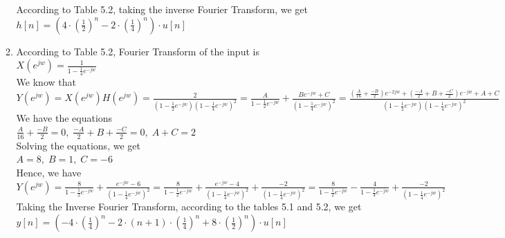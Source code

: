 \documentclass[10pt,a4paper, margin=1in]{article}
\begin{document}
\begin{enumerate}
\begin{enumerate}
    According to Table 5.2, taking the inverse Fourier Transform, we get\vspace{0.3cm}\\
    $h[n] = (4\cdot (\frac{1}{2})^n -2 \cdot (\frac{1}{4})^n)\cdot u[n]$\vspace{0.3cm}\\
	\item %
	According to Table 5.2, Fourier Transform of the input is\vspace{0.3cm}\\
    $X(e^{jw}) = \frac{1}{1-\frac{1}{4}e^{-jw}}$\vspace{0.3cm}\\
    We know that\vspace{0.3cm}\\
    $Y(e^{jw}) = X(e^{jw})H(e^{jw}) = \frac{2}{(1-\frac{1}{2}e^{-jw})(1-\frac{1}{4}e^{-jw})^2} = \frac{A}{1-\frac{1}{2}e^{-jw}} + \frac{Be^{-jw} + C}{(1-\frac{1}{4}e^{-jw})^2} = \frac{(\frac{A}{16}+\frac{-B}{2})e^{-2jw}+(\frac{-A}{2}+B+\frac{-C}{2})e^{-jw}+A+C}{(1-\frac{1}{2}e^{-jw})(1-\frac{1}{4}e^{-jw})^2}$\vspace{0.3cm}\\
    We have the equations\vspace{0.3cm}\\
    $\frac{A}{16}+\frac{-B}{2}=0,\; \frac{-A}{2}+B+\frac{-C}{2}=0,\; A+C=2$\vspace{0.3cm}\\
    Solving the equations, we get\vspace{0.3cm}\\
    $A=8,\; B=1,\; C=-6$\vspace{0.3cm}\\
    Hence, we have\vspace{0.3cm}\\
    $Y(e^{jw}) = \frac{8}{1-\frac{1}{2}e^{-jw}} + \frac{e^{-jw}-6}{(1-\frac{1}{4}e^{-jw})^2} = \frac{8}{1-\frac{1}{2}e^{-jw}} + \frac{e^{-jw}-4}{(1-\frac{1}{4}e^{-jw})^2} + \frac{-2}{(1-\frac{1}{4}e^{-jw})^2} = \frac{8}{1-\frac{1}{2}e^{-jw}} - \frac{4}{1-\frac{1}{4}e^{-jw}} + \frac{-2}{(1-\frac{1}{4}e^{-jw})^2}$\vspace{0.3cm}\\
    Taking the Inverse Fourier Transform, according to the tables 5.1 and 5.2, we get\vspace{0.3cm}\\
    $y[n] = (-4\cdot (\frac{1}{4})^n -2 \cdot (n+1) \cdot (\frac{1}{4})^n + 8 \cdot (\frac{1}{2})^n)\cdot u[n]$\vspace{0.3cm}\\
    \end{enumerate}


\end{enumerate}
\end{document}
